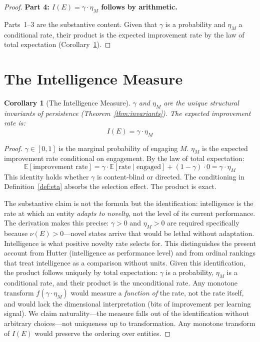 \documentclass[11pt]{article}
\newtheorem{corollary}[theorem]{Corollary}
\theoremstyle{definition}
\theoremstyle{remark}
\begin{document}
\begin{proof}
\medskip
\textbf{Part 4: $I(E) = \gamma \cdot \eta_M$ follows by arithmetic.}

Parts~1--3 are the substantive content. Given that $\gamma$ is a
probability and $\eta_M$ a conditional rate, their product is the
expected improvement rate by the law of total expectation
(Corollary~\ref{cor:measure}).
\end{proof}

\section{The Intelligence Measure}
\label{sec:measure}

\begin{corollary}[The Intelligence Measure]
\label{cor:measure}
$\gamma$ and $\eta_M$ are the unique structural invariants of persistence
(Theorem~\ref{thm:invariants}). The expected improvement rate is:
\[
I(E) = \gamma \cdot \eta_M
\]
\end{corollary}

\begin{proof}
$\gamma \in [0, 1]$ is the marginal probability of engaging $M$.
$\eta_M$ is the expected improvement rate conditional on engagement.
By the law of total expectation:
\[
\mathbb{E}[\text{improvement rate}]
= \gamma \cdot \mathbb{E}[\text{rate} \mid \text{engaged}]
+ (1 - \gamma) \cdot 0
= \gamma \cdot \eta_M
\]
This identity holds whether $\gamma$ is content-blind or directed.
The conditioning in Definition~\ref{def:eta} absorbs the selection
effect. The product is exact.

The substantive claim is not the formula but the identification:
intelligence is the rate at which an entity \emph{adapts to novelty},
not the level of its current performance. The derivation makes this
precise: $\gamma > 0$ and $\eta_M > 0$ are required specifically
because $\nu(E) > 0$---novel states arrive that would be lethal
without adaptation. Intelligence is what positive novelty rate
selects for.
This distinguishes the present account from Hutter
\cite{Hutter2005} (intelligence as performance level) and from
ordinal rankings that treat intelligence as a comparison without
units. Given this identification, the product follows uniquely by
total expectation: $\gamma$ is a probability, $\eta_M$ is a
conditional rate, and their product is the unconditional rate.
Any monotone transform $f(\gamma \cdot \eta_M)$ would measure a
\emph{function of} the rate, not the rate itself, and would lack
the dimensional interpretation (bits of improvement per learning
signal). We claim naturality---the measure falls out of the identification
without arbitrary choices---not uniqueness up to transformation.
Any monotone transform of $I(E)$ would preserve the ordering over
entities.
\end{proof}
\end{document}
